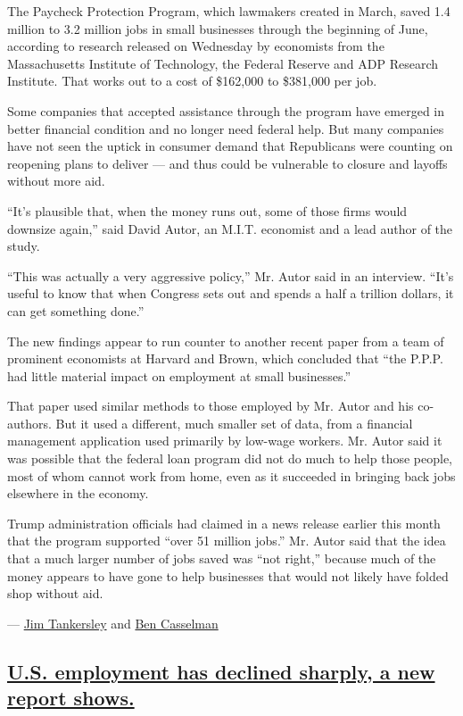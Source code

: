 The Paycheck Protection Program, which lawmakers created in March, saved
1.4 million to 3.2 million jobs in small businesses through the
beginning of June, according to research released on Wednesday by
economists from the Massachusetts Institute of Technology, the Federal
Reserve and ADP Research Institute. That works out to a cost of
\$162,000 to \$381,000 per job.

Some companies that accepted assistance through the program have emerged
in better financial condition and no longer need federal help. But many
companies have not seen the uptick in consumer demand that Republicans
were counting on reopening plans to deliver --- and thus could be
vulnerable to closure and layoffs without more aid.

``It's plausible that, when the money runs out, some of those firms
would downsize again,'' said David Autor, an M.I.T. economist and a lead
author of the study.

``This was actually a very aggressive policy,'' Mr. Autor said in an
interview. ``It's useful to know that when Congress sets out and spends
a half a trillion dollars, it can get something done.''

The new findings appear to run counter to another recent paper from a
team of prominent economists at Harvard and Brown, which concluded that
``the P.P.P. had little material impact on employment at small
businesses.''

That paper used similar methods to those employed by Mr. Autor and his
co-authors. But it used a different, much smaller set of data, from a
financial management application used primarily by low-wage workers. Mr.
Autor said it was possible that the federal loan program did not do much
to help those people, most of whom cannot work from home, even as it
succeeded in bringing back jobs elsewhere in the economy.

Trump administration officials had claimed in a news release earlier
this month that the program supported ``over 51 million jobs.'' Mr.
Autor said that the idea that a much larger number of jobs saved was
``not right,'' because much of the money appears to have gone to help
businesses that would not likely have folded shop without aid.

--- \href{https://www.nytimes.com/by/jim-tankersley}{Jim Tankersley} and
\href{https://www.nytimes.com/by/ben-casselman}{Ben Casselman}

\hypertarget{us-employment-has-declined-sharply-a-new-report-shows}{%
\subsection{\texorpdfstring{\protect\hyperlink{us-employment-has-declined-sharply-a-new-report-shows}{U.S.
employment has declined sharply, a new report
shows.}}{U.S. employment has declined sharply, a new report shows.}}\label{us-employment-has-declined-sharply-a-new-report-shows}}

